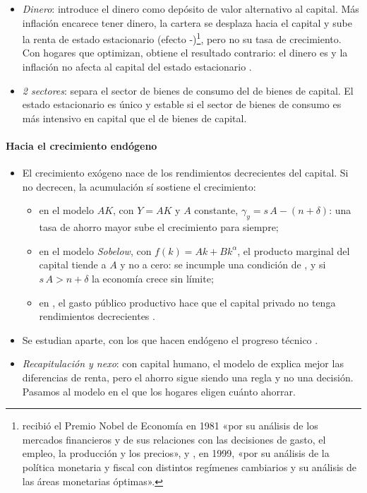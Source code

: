 \documentclass[11pt]{article}
\begin{document}
\begin{itemize}
\item \emph{Dinero}: \textcite{Tobin1965} introduce el dinero como depósito de valor alternativo al capital. Más inflación encarece tener dinero, la cartera se desplaza hacia el capital y sube la renta de estado estacionario (efecto -)\footnote{ recibió el Premio Nobel de Economía en 1981 «por su análisis de los mercados financieros y de sus relaciones con las decisiones de gasto, el empleo, la producción y los precios»\nocite{Nobel1981Tobin}, y , en 1999, «por su análisis de la política monetaria y fiscal con distintos regímenes cambiarios y su análisis de las áreas monetarias óptimas»\nocite{Nobel1999Mundell}.}, pero no su tasa de crecimiento. Con hogares que optimizan, \textcite{Sidrauski1967Rational} obtiene el resultado contrario: el dinero es  y la inflación no afecta al capital del estado estacionario .
\item \emph{2 sectores}: \textcite{Uzawa1961dos,Uzawa1963TwoSector} separa el sector de bienes de consumo del de bienes de capital. El estado estacionario es único y estable si el sector de bienes de consumo es más intensivo en capital que el de bienes de capital.
\end{itemize}

\paragraph{Hacia el crecimiento endógeno}

\begin{itemize}
\item El crecimiento exógeno nace de los rendimientos decrecientes del capital. Si no decrecen, la acumulación sí sostiene el crecimiento:
  \begin{itemize}
  \item en el modelo $AK$\nocite{Rebelo1991Long}, con $Y=AK$ y $A$ constante, $\gamma_y=s\,A-(n+\delta)$: una tasa de ahorro mayor sube el crecimiento para siempre;
  \item en el modelo \emph{Sobelow}\nocite{JonesManuelli1990}, con $f(k)=Ak+Bk^{\alpha}$, el producto marginal del capital tiende a $A$ y no a cero: se incumple una condición de , y si $s\,A>n+\delta$ la economía crece sin límite;
  \item en \textcite{Barro1990}, el gasto público productivo hace que el capital privado no tenga rendimientos decrecientes .
  \end{itemize}
\item Se estudian aparte, con los que hacen endógeno el progreso técnico .
\item \emph{Recapitulación y nexo}: con capital humano, el modelo de  explica mejor las diferencias de renta, pero el ahorro sigue siendo una regla y no una decisión. Pasamos al modelo en el que los hogares eligen cuánto ahorrar.
\end{itemize}
\end{document}
